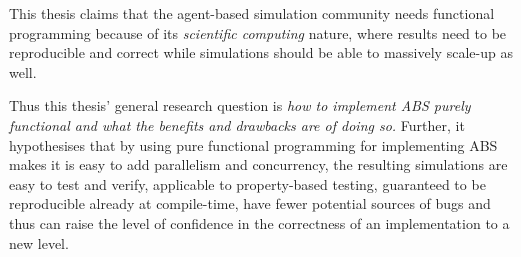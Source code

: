 This thesis claims that the agent-based simulation community needs functional programming because of its \textit{scientific computing} nature, where results need to be reproducible and correct while simulations should be able to massively scale-up as well. %

Thus this thesis' general research question is \textit{how to implement ABS purely functional and what the benefits and drawbacks are of doing so.} Further, it hypothesises that by using pure functional programming for implementing ABS makes it is easy to add parallelism and concurrency, the resulting simulations are easy to test and verify, applicable to property-based testing, guaranteed to be reproducible already at compile-time, have fewer potential sources of bugs and thus can raise the level of confidence in the correctness of an implementation to a new level.

\newpage

